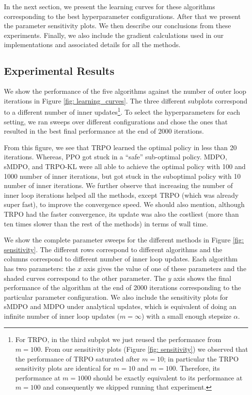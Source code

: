 \documentclass[a4paper, 10pt]{article}
\begin{document}
In the next section, we present the learning curves for these algorithms corresponding to the best hyperparameter configurations. After that we present the parameter sensitivity plots. We then describe our conclusions from these experiments. Finally, we also include the gradient calculations used in our implementations and associated details for all the methods.

\subsection{Experimental Results}
We show the performance of the five algorithms against the number of outer loop iterations in Figure \ref{fig: learning_curves}. The three different subplots correspond to a different number of inner updates\footnote{For TRPO, in the third subplot we just reused the performance from $m=100$. From our sensitivity plots (Figure \ref{fig: sensitivity}) we observed that the performance of TRPO saturated after $m = 10$; in particular the TRPO sensitivity plots are identical for $m=10$ and $m=100$. Therefore, its performance at $m=1000$ should be exactly equivalent to its performance at $m=100$ and consequently we skipped running that experiment.}. To select the hyperparameters for each setting, we ran sweeps over different configurations and chose the ones that resulted in the best final performance at the end of 2000 iterations.

From this figure, we see that TRPO learned the optimal policy in less than 20 iterations. Whereas, PPO got stuck in a ``safe'' sub-optimal policy. MDPO, sMDPO, and TRPO-KL were all able to achieve the optimal policy with 100 and 1000 number of inner iterations, but got stuck in the suboptimal policy with 10 number of inner iterations. We further observe that increasing the number of inner loop iterations helped all the methods, except TRPO (which was already super fast), to improve the convergence speed. We should also mention, although TRPO had the faster convergence, its update was also the costliest (more than ten times slower than the rest of the methods) in terms of wall time. 

We show the complete parameter sweeps for the different methods in Figure \ref{fig: sensitivity}. The different rows correspond to different algorithms and the columns correspond to different number of inner loop updates. Each algorithm has two parameters: the $x$ axis gives the value of one of these parameters and the shaded curves correspond to the other parameter. The $y$ axis shows the final performance of the algorithm at the end of 2000 iterations corresponding to the particular parameter configuration. We also include the sensitivity plots for sMDPO and MDPO under analytical updates, which is equivalent of doing an infinite number of inner loop updates ($m = \infty$) with a small enough stepsize $\alpha$.
\end{document}

